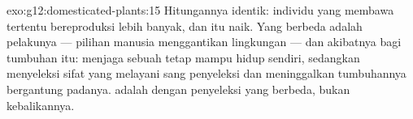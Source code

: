 \begin{solution}{exo:g12:domesticated-plants:15}
Hitungannya identik: individu yang membawa  tertentu bereproduksi
lebih banyak, dan  itu naik. Yang berbeda adalah
pelakunya --- pilihan manusia menggantikan lingkungan --- dan akibatnya
bagi tumbuhan itu:  menjaga sebuah  tetap mampu
hidup sendiri, sedangkan  menyeleksi sifat yang melayani
sang penyeleksi dan meninggalkan tumbuhannya bergantung padanya.
 adalah  dengan penyeleksi yang berbeda, bukan
kebalikannya.
\end{solution}

